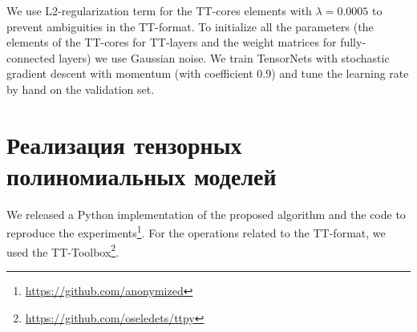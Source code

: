 
We use L$2$-regularization term for the TT-cores elements with $\lambda = 0.0005$ to prevent ambiguities in the TT-format. To initialize all the parameters (the elements of the TT-cores for TT-layers and the weight matrices for fully-connected layers) we use Gaussian noise. We train TensorNets with stochastic gradient descent with momentum (with coefficient $0.9$) and tune the learning rate by hand on the validation set.


\section{Реализация тензорных полиномиальных моделей} \label{sec:exm-experiments}

We released a Python implementation of the proposed algorithm and the code to reproduce the experiments\footnote{\url{https://github.com/anonymized}}.
For the operations related to the TT-format, we used the TT-Toolbox\footnote{\url{https://github.com/oseledets/ttpy}}.


